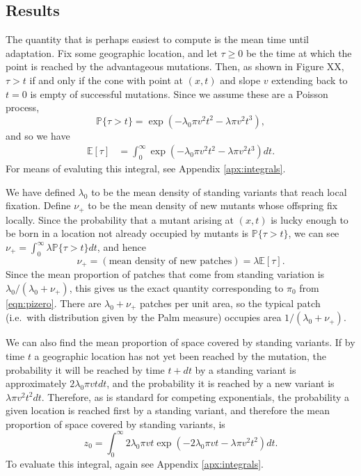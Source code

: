 \documentclass{article}
\renewcommand{\P}{\mathbb{P}}
\newcommand{\E}{\mathbb{E}}
\begin{document}
\subsection{Results} 

The quantity that is perhaps easiest to compute is the mean time until adaptation.
Fix some geographic location, and let $\tau\ge0$ be the time at which the point is reached by the advantageous mutations.
Then, as shown in Figure XX,
$\tau > t$ if and only if the cone with point at $(x,t)$ and slope $v$ extending back to $t=0$ is empty of successful mutations.
Since we assume these are a Poisson process, 
\[
    \P\{ \tau > t \} = \exp\left( - \lambda_0 \pi v^2 t^2 - \lambda \pi v^2 t^3 \right) ,
\]
and so we have
\begin{align}
    \E[\tau] %
        &= \int_0^\infty \exp\left( - \lambda_0 \pi v^2 t^2 - \lambda \pi v^2 t^3 \right) dt.
\end{align}
For means of evaluting this integral, see Appendix \ref{apx:integrals}.


We have defined $\lambda_0$ to be the mean density of standing variants that reach local fixation.
Define $\nu_+$ to be the mean density of new mutants whose offspring fix locally.
Since the probability that a mutant arising at $(x,t)$ is lucky enough to be born in a location not already occupied by mutants
is $\P\{ \tau > t \}$,
we can see  $\nu_+ = \int_0^\infty \lambda \P\{\tau>t\} dt$, and hence
\begin{equation}
    \nu_+ = (\mbox{mean density of new patches}) = \lambda \E[\tau] .
\end{equation}
Since the mean proportion of patches that come from standing variation is $\lambda_0 / (\lambda_0 + \nu_+)$,
this gives us the exact quantity corresponding to $\pi_0$ from \eqref{eqn:pizero}.
There are $\lambda_0 + \nu_+$ patches per unit area, so
the typical patch (i.e.\ with distribution given by the Palm measure) occupies area $1/(\lambda_0 + \nu_+)$.

We can also find the mean proportion of space covered by standing variants.
If by time $t$ a geographic location has not yet been reached by the mutation,
the probability it will be reached by time $t+dt$ 
by a standing variant is approximately $2 \lambda_0 \pi vt dt$, 
and the probability it is reached by a new variant is $\lambda \pi v^2 t^2 dt$.
Therefore, as is standard for competing exponentials,
the probability a given location is reached first by a standing variant,
and therefore the mean proportion of space covered  by standing variants,
is
\begin{equation}
    z_0 = \int_0^\infty {2 \lambda_0 \pi v t} \exp \left( - 2 \lambda_0 \pi v t - \lambda \pi v^2 t^2 \right) dt .
\end{equation}
To evaluate this integral, again see Appendix \ref{apx:integrals}.
\end{document}
